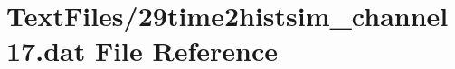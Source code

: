 \hypertarget{29time2histsim__channel17_8dat}{}\section{Text\+Files/29time2histsim\+\_\+channel17.dat File Reference}
\label{29time2histsim__channel17_8dat}
